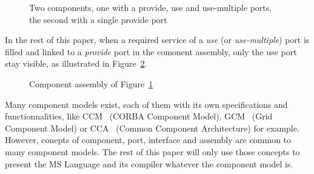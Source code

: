 \begin{figure}[h!]
\begin{center}
\caption{Two components, one with a provide, use and use-multiple ports, the second with a single provide port}
\label{fig:ports}
\end{center}
\end{figure}

In the rest of this paper, when a required service of a \emph{use} (or \emph{use-multiple}) port is filled and linked to a \emph{provide} port in the comonent assembly, only the use port stay visible, as illustrated in Figure~\ref{fig:assembly}.

\begin{figure}[h!]
\begin{center}
\caption{Component assembly of Figure~\ref{fig:ports}}
\label{fig:assembly}
\end{center}
\end{figure}

Many component models exist, each of them with its own specifications and functionnalities, like CCM~\cite{corba:omg06} (CORBA Component Model), GCM~\cite{Baude} (Grid Component Model) or CCA~\cite{Armstrong:1999:TCC:822084.823232} (Common Component Architecture) for example. However, conepts of component, port, interface and assembly are common to many component models. The rest of this paper will only use those concepts to present the MS Language and its compiler whatever the component model is.

